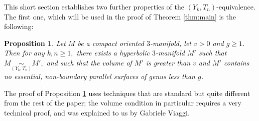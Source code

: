 \documentclass[12pt]{amsart}
\newtheorem{prop}[thm]{Proposition}
\theoremstyle{definition}
\begin{document}
This short section establishes two further properties of the $(Y_k,T_n)$-equivalence. The first one, which will be used in the proof of Theorem \ref{thm:main} is the following:
\begin{prop}
	\label{prop:hyperbolic} Let $M$ be a compact oriented $3$-manifold, let $v>0$ and $g\geq 1$. Then for any $k,n\geq 1,$  there exists a hyperbolic $3$-manifold $M'$ such that $M\underset{(Y_k,T_n)}{\sim} M',$ and such that the volume of $M'$ is greater than $v$ and $M'$ contains no essential, non-boundary parallel surfaces of genus less than $g$.
\end{prop}
The proof of Proposition \ref{prop:hyperbolic} uses techniques that are standard but quite different from the rest of the paper; the volume condition in particular requires a very technical proof, and was explained to us by Gabriele Viaggi.
\end{document}
